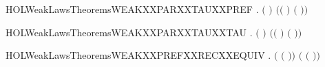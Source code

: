 \newcommand{\HOLWeakLawsTheoremsWEAKXXPARXXPREFXXTAU}{\UseVerbatim{HOLWeakLawsTheoremsWEAKXXPARXXPREFXXTAU}}
\begin{SaveVerbatim}{HOLWeakLawsTheoremsWEAKXXPARXXTAUXXPREF}
\HOLTokenTurnstile{} \HOLSymConst{\HOLTokenForall{}}  .
        \ensuremath{(}\HOLConst{\ensuremath{\tau}}\HOLSymConst{\ensuremath{\ldotp}} \HOLSymConst{\ensuremath{\mid}} \HOLSymConst{\ensuremath{\ldotp}}\ensuremath{)} \ensuremath{(}\HOLConst{\ensuremath{\tau}}\HOLSymConst{\ensuremath{\ldotp}}\ensuremath{(} \HOLSymConst{\ensuremath{\mid}} \HOLSymConst{\ensuremath{\ldotp}}\ensuremath{)} \HOLSymConst{\ensuremath{+}} \HOLSymConst{\ensuremath{\ldotp}}\ensuremath{(}\HOLConst{\ensuremath{\tau}}\HOLSymConst{\ensuremath{\ldotp}} \HOLSymConst{\ensuremath{\mid}} \ensuremath{)}\ensuremath{)}
\end{SaveVerbatim}
\newcommand{\HOLWeakLawsTheoremsWEAKXXPARXXTAUXXPREF}{\UseVerbatim{HOLWeakLawsTheoremsWEAKXXPARXXTAUXXPREF}}
\begin{SaveVerbatim}{HOLWeakLawsTheoremsWEAKXXPARXXTAUXXTAU}
\HOLTokenTurnstile{} \HOLSymConst{\HOLTokenForall{}} .  \ensuremath{(}\HOLConst{\ensuremath{\tau}}\HOLSymConst{\ensuremath{\ldotp}} \HOLSymConst{\ensuremath{\mid}} \HOLConst{\ensuremath{\tau}}\HOLSymConst{\ensuremath{\ldotp}}\ensuremath{)} \ensuremath{(}\HOLConst{\ensuremath{\tau}}\HOLSymConst{\ensuremath{\ldotp}}\ensuremath{(} \HOLSymConst{\ensuremath{\mid}} \HOLConst{\ensuremath{\tau}}\HOLSymConst{\ensuremath{\ldotp}}\ensuremath{)} \HOLSymConst{\ensuremath{+}} \HOLConst{\ensuremath{\tau}}\HOLSymConst{\ensuremath{\ldotp}}\ensuremath{(}\HOLConst{\ensuremath{\tau}}\HOLSymConst{\ensuremath{\ldotp}} \HOLSymConst{\ensuremath{\mid}} \ensuremath{)}\ensuremath{)}
\end{SaveVerbatim}
\newcommand{\HOLWeakLawsTheoremsWEAKXXPARXXTAUXXTAU}{\UseVerbatim{HOLWeakLawsTheoremsWEAKXXPARXXTAUXXTAU}}
\begin{SaveVerbatim}{HOLWeakLawsTheoremsWEAKXXPREFXXRECXXEQUIV}
\HOLTokenTurnstile{} \HOLSymConst{\HOLTokenForall{}}  .  \ensuremath{(}\HOLSymConst{\ensuremath{\ldotp}}  \ensuremath{(}\HOLSymConst{\ensuremath{\ldotp}}\HOLSymConst{\ensuremath{\ldotp}} \ensuremath{)}\ensuremath{)} \ensuremath{(}  \ensuremath{(}\HOLSymConst{\ensuremath{\ldotp}}\HOLSymConst{\ensuremath{\ldotp}} \ensuremath{)}\ensuremath{)}
\end{SaveVerbatim}
